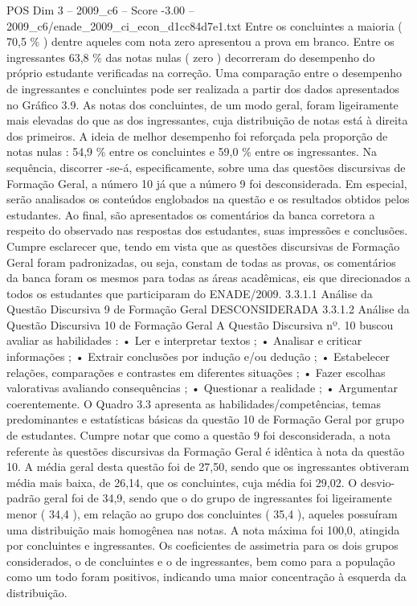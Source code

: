 \begin{textsample}{POS Dim 3 – 2009\_c6 – Score -3.00 – 2009\_c6/enade\_2009\_ci\_econ\_d1cc84d7e1.txt}
Entre os concluintes a maioria ( 70,5 \% ) dentre aqueles com nota zero apresentou a prova em branco.
Entre os ingressantes 63,8 \% das notas nulas ( zero ) decorreram do desempenho do próprio estudante verificadas na correção.
Uma comparação entre o desempenho de ingressantes e concluintes pode ser realizada a partir dos dados apresentados no Gráfico 3.9.
As notas dos concluintes, de um modo geral, foram ligeiramente mais elevadas do que as dos ingressantes, cuja distribuição de notas está à direita dos primeiros.
A ideia de melhor desempenho foi reforçada pela proporção de notas nulas : 54,9 \% entre os concluintes e 59,0 \% entre os ingressantes.
Na sequência, discorrer -se-á, especificamente, sobre uma das questões discursivas de Formação Geral, a número 10 já que a número 9 foi desconsiderada.
Em especial, serão analisados os conteúdos englobados na questão e os resultados obtidos pelos estudantes.
Ao final, são apresentados os comentários da banca corretora a respeito do observado nas respostas dos estudantes, suas impressões e conclusões.
Cumpre esclarecer que, tendo em vista que as questões discursivas de Formação Geral foram padronizadas, ou seja, constam de todas as provas, os comentários da banca foram os mesmos para todas as áreas acadêmicas, eis que direcionados a todos os estudantes que participaram do ENADE/2009. 3.3.1.1 Análise da Questão Discursiva 9 de Formação Geral DESCONSIDERADA 3.3.1.2 Análise da Questão Discursiva 10 de Formação Geral A Questão Discursiva nº. 10 buscou avaliar as habilidades : • Ler e interpretar textos ; • Analisar e criticar informações ; • Extrair conclusões por indução e/ou dedução ; • Estabelecer relações, comparações e contrastes em diferentes situações ; • Fazer escolhas valorativas avaliando consequências ; • Questionar a realidade ; • Argumentar coerentemente.
O Quadro 3.3 apresenta as habilidades/competências, temas predominantes e estatísticas básicas da questão 10 de Formação Geral por grupo de estudantes.
Cumpre notar que como a questão 9 foi desconsiderada, a nota referente às questões discursivas da Formação Geral é idêntica à nota da questão 10.
A média geral desta questão foi de 27,50, sendo que os ingressantes obtiveram média mais baixa, de 26,14, que os concluintes, cuja média foi 29,02.
O desvio-padrão geral foi de 34,9, sendo que o do grupo de ingressantes foi ligeiramente menor ( 34,4 ), em relação ao grupo dos concluintes ( 35,4 ), aqueles possuíram uma distribuição mais homogênea nas notas.
A nota máxima foi 100,0, atingida por concluintes e ingressantes.
Os coeficientes de assimetria para os dois grupos considerados, o de concluintes e o de ingressantes, bem como para a população como um todo foram positivos, indicando uma maior concentração à esquerda da distribuição.

\end{textsample}
